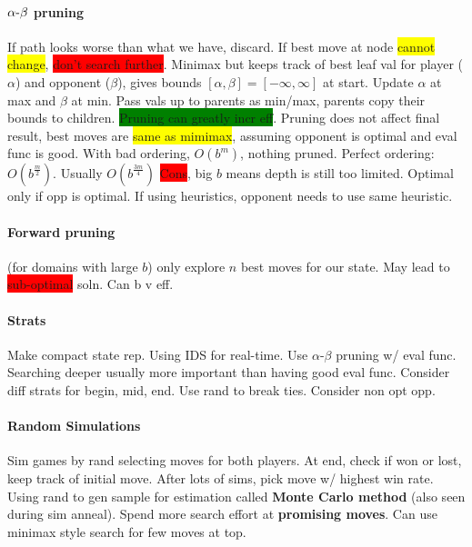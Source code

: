 \paragraph{$\alpha\hbox{-}\beta$ pruning} If path looks worse than
what we have, discard. If best move at node \colorbox{yellow}{cannot change}, \colorbox{red}{don't
search further}. Minimax but keeps track of best leaf val for player
($\alpha$) and opponent ($\beta$), gives bounds
$[\alpha,\beta]=[-\infty,\infty]$ at start. Update $\alpha$ at max and
$\beta$ at min. Pass vals up to parents as min/max, parents copy their
bounds to children. \colorbox{green}{Pruning can greatly incr
  eff}. Pruning does not affect final result, best moves are
\colorbox{yellow}{same as mimimax}, assuming opponent is optimal and
eval func is good. With bad ordering, $O(b^m)$, nothing
pruned. Perfect ordering: $O(b^{\frac{m}{2}})$. Usually
$O(b^{\frac{3m}{4}})$ \colorbox{red}{Cons}, big $b$ means depth is
still too limited. Optimal only if opp is optimal. If using
heuristics, opponent needs to use same heuristic.
\paragraph{Forward pruning} (for domains with large $b$) only explore
$n$ best moves for our state. May lead to \colorbox{red}{sub-optimal}
soln. Can b v eff.
\paragraph{Strats} Make compact state rep. Using IDS for
real-time. Use $\alpha$-$\beta$ pruning w/ eval func. Searching deeper
usually more important than having good eval func. Consider diff
strats for begin, mid, end. Use rand to break ties. Consider non opt opp.
\paragraph{Random Simulations} Sim games by rand selecting moves for
both players. At end, check if won or lost, keep track of initial
move. After lots of sims, pick move w/ highest win rate. Using rand to
gen sample for estimation called \textbf{Monte Carlo method} (also
seen during sim anneal). Spend more search effort at \textbf{promising
  moves}. Can use minimax style search for few moves at top.
